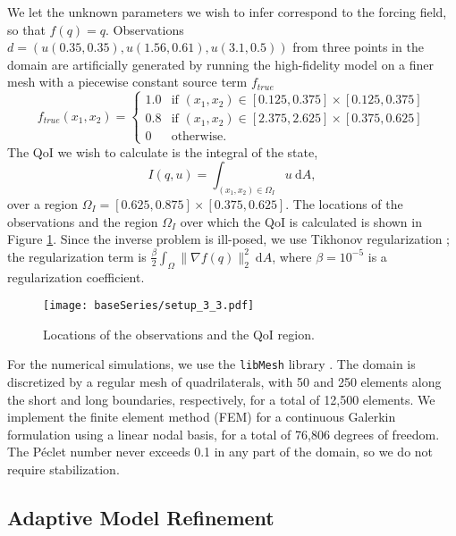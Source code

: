 We let the unknown parameters we wish to infer correspond to the forcing field, so that $f(q)=q$. Observations $d=(u(0.35,0.35),u(1.56,0.61),u(3.1,0.5))$ from three points in the domain are artificially generated by running the high-fidelity model on a finer mesh with a piecewise constant source term $f_{true}$
\begin{equation}
f_{true}(x_1,x_2)=
\begin{cases}
1.0 & \textrm{if }(x_1,x_2)\in[0.125,0.375]\times[0.125,0.375] \\
0.8 & \textrm{if }(x_1,x_2)\in[2.375,2.625]\times[0.375,0.625] \\
0 & \textrm{otherwise}.
\end{cases}
\end{equation}
The QoI we wish to calculate is the integral of the state,
\begin{equation}
I(q,u)=\int_{(x_1,x_2)\in \Omega_I} u \:\textrm{d}A,
\end{equation}
over a region $\Omega_I=[0.625,0.875]\times[0.375,0.625]$. The locations of the observations and the region $\Omega_I$ over which the QoI is calculated is shown in Figure \ref{fig:baseSetup}. Since the inverse problem is ill-posed, we use Tikhonov regularization \cite{EngHanNeu00}; the regularization term is $\frac{\beta}{2}\int_\Omega \|\nabla f(q)\|_2^2\:\textrm{d}A$, where $\beta=10^{-5}$ is a regularization coefficient.

\begin{figure}[h]
\centering
\texttt{[image: baseSeries/setup\_3\_3.pdf]}
\caption{Locations of the observations and the QoI region.}
\label{fig:baseSetup}
\end{figure}

For the numerical simulations, we use the \texttt{libMesh} library \cite{libMeshPaper}. The domain is discretized by a regular mesh of quadrilaterals, with 50 and 250 elements along the short and long boundaries, respectively, for a total of 12,500 elements. We implement the finite element method (FEM) for a continuous Galerkin formulation using a linear nodal basis, for a total of 76,806 degrees of freedom. The P\'{e}clet number never exceeds 0.1 in any part of the domain, so we do not require stabilization.

\subsection{Adaptive Model Refinement} \label{sec:cdvcdrBaseRef} 

